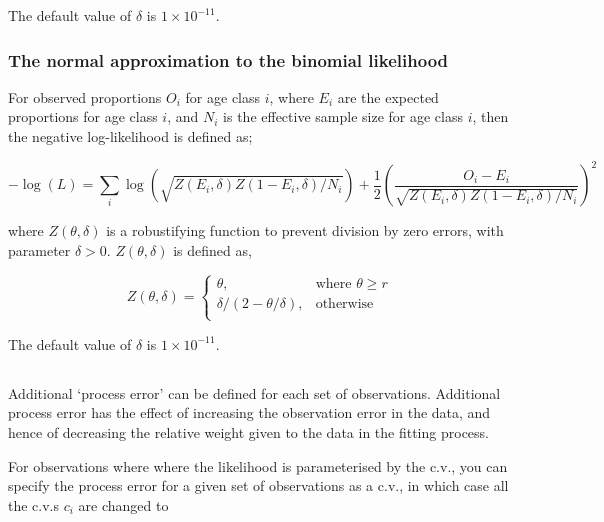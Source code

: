 {{{{The default value of $\delta$ is $1 \times 10^{-11}$.

\subsubsection*{The normal approximation to the binomial likelihood}

For observed proportions $O_i$ for age class $i$, where $E_i$ are the expected proportions for age class $i$, and $N_i$ is the effective sample size for age class $i$, then the negative log-likelihood is defined as;  

\begin{equation}
-\log \left(L \right)= \sum\limits_i \log \left( \sqrt{Z\left(E_i,\delta \right)Z\left(1-E_i,\delta\right)/N_i} \right)     + \frac{1}{2} \left( \frac{O_i-E_i}{\sqrt{Z\left(E_i,\delta\right)Z\left(1-E_i,\delta \right)/N_i}} \right)^2
\end{equation}

where $Z \left(\theta,\delta \right)$ is a robustifying function to prevent division by zero errors, with parameter $\delta>0$. $Z \left(\theta,\delta \right)$ is defined as,

\begin{equation}
Z \left(\theta,\delta \right) = \begin{cases}
\theta, & \text{where $\theta \ge r$} \\
\delta/\left( 2-\theta/\delta \right), & \text{otherwise} \\  
\end{cases}
\end{equation}

The default value of $\delta$ is $1 \times 10^{-11}$.

\subsection{}

Additional `process error' can be defined for each set of observations. Additional process error has the effect of increasing the observation error in the data, and hence of decreasing the relative weight given to the data in the fitting process. 

For observations where where the likelihood is parameterised by the c.v., you can specify the process error for a given set of observations as a c.v., in which case all the c.v.s $c_i$ are changed to

}}}}
